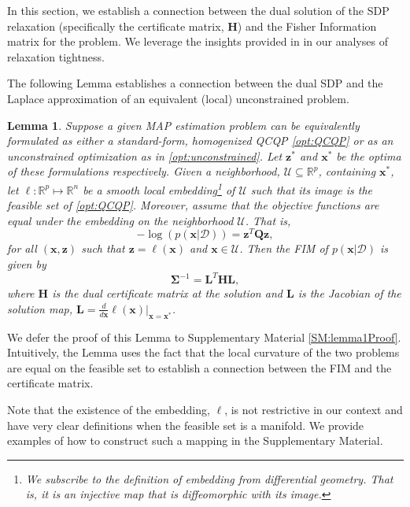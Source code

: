 \documentclass[lettersize,journal]{IEEEtran}
\newtheorem{lemma}[theorem]{Lemma}
\begin{document}
{In this section, we establish a connection between the dual solution of the SDP relaxation (specifically the certificate matrix, $\bm{H}$) and the Fisher Information matrix for the problem. We leverage the insights provided in \cite{zhangDegeneracyOptimizationbasedState2016} in our analyses of relaxation tightness. 

The following Lemma establishes a connection between the dual SDP and the Laplace approximation of an equivalent (local) unconstrained problem. 

\begin{lemma}\label{thm:FisherInfo}
	Suppose a given MAP estimation problem can be equivalently formulated as either a standard-form, homogenized QCQP \eqref{opt:QCQP} or as an unconstrained optimization as in \eqref{opt:unconstrained}. Let $\bm{z}^*$ and $\bm{x}^*$ be the optima of these formulations respectively. Given a neighborhood, $\mathcal{U} \subseteq \mathbb{R}^p$, containing $\bm{x}^*$, let $\bm{\ell}: \mathbb{R}^p \mapsto \mathbb{R}^n$ be a \emph{smooth local embedding}\footnote{We subscribe to the definition of embedding from differential geometry. That is, it is an injective map that is diffeomorphic with its image.} of $\mathcal{U}$ such that its image is the feasible set of \eqref{opt:QCQP}. Moreover, assume that the objective functions are equal under the embedding on the neighborhood $\mathcal{U}$. That is,
	\begin{equation}
		-\log\left(p(\bm{x} \vert \bm{\mathcal{D}})\right) = \bm{z}^T \bm{Q} \bm{z},
	\end{equation}
	for all $(\bm{x}, \bm{z})$ such that $\bm{z}=\mathbb{\ell}(\bm{x})$ and $\bm{x} \in \mathcal{U}$. Then the FIM of $p(\bm{x} \vert \bm{\mathcal{D}})$ is given by
	\begin{equation}
		\bm{\Sigma}^{-1}= \bm{L}^T \bm{H}\bm{L},
	\end{equation}
	where $\bm{H}$ is the dual certificate matrix at the solution and $\bm{L}$ is the Jacobian of the solution map, $\bm{L} = \frac{d}{d\bm{x}}\bm{\ell}(\bm{x})\vert_{\bm{x}=\bm{x}^*}$. 
\end{lemma}

We defer the proof of this Lemma to Supplementary Material \ref{SM:lemma1Proof}. Intuitively, the Lemma uses the fact that the local curvature of the two problems are equal on the feasible set to establish a connection between the FIM and the certificate matrix. 

Note that the existence of the embedding, $\bm{\ell}$, is not restrictive in our context and have very clear definitions when the feasible set is a manifold. We provide examples of how to construct such a mapping in the Supplementary Material.

}
\end{document}
